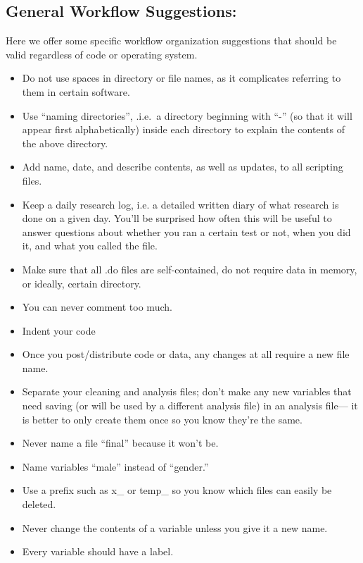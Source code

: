 \documentclass[12pt] {article}
\begin{document}
\subsection{General Workflow
Suggestions:}\label{general-workflow-suggestions}
Here we offer some specific workflow organization suggestions that should be valid regardless of code or operating system.
\begin{itemize}
\item
  Do not use spaces in directory or file names, as it complicates referring to them in certain software.
\item
  Use ``naming directories'', .i.e.~a directory beginning with ``-'' (so
  that it will appear first alphabetically) inside each directory to
  explain the contents of the above directory.
\item
  Add name, date, and describe contents, as well as updates, to all
  scripting files.
\item
  Keep a daily research log, i.e. a detailed written diary of what research is done on a given day. You'll be surprised how often this will be useful to answer questions about whether you ran a certain test or not, when you did it, and what you called the file.
  
\item
    Make sure that all .do files are self-contained, do not require data
    in memory, or ideally, certain directory.
 
\item
  You can never comment too much.
\item
  Indent your code
\item
    Once you post/distribute code or data, any changes at all require a
    new file name.
\item
  Separate your cleaning and analysis files; don't make any new variables
  that need saving (or will be used by a different analysis
  file) in an analysis file--- it is better to only create them once so you know they're the same.
\item
  Never name a file ``final'' because it won't be.
\item
  Name variables ``male'' instead of ``gender.''
\item
  Use a prefix such as x\_ or temp\_ so you know which files can easily
  be deleted.
\item
  Never change the contents of a variable unless you give it a new name.
\item
  Every variable should have a label.
\end{itemize}
\end{document}
